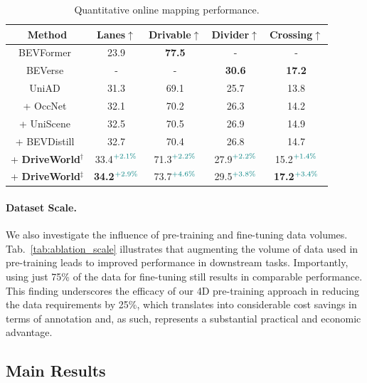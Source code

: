 \begin{table}[t]
	\centering
	\resizebox{0.5\textwidth}{!}
	{
		\begin{tabular}{c|c|c|c|c}
			\toprule
			\textbf{Method}&\textbf{Lanes}$\uparrow$&\textbf{Drivable}$\uparrow$&\textbf{Divider}$\uparrow$&\textbf{Crossing}$\uparrow$\\
			\midrule
			BEVFormer~\cite{bevformer}&23.9&\bf77.5&-&- \\
			BEVerse~\cite{beverse} &-&-&\bf30.6&\bf17.2 \\
			\midrule
			UniAD~\cite{uniad}&31.3&69.1&25.7&13.8 \\
			+ OccNet~\cite{occnet}&32.1&70.2&26.3&14.2 \\ 
			+ UniScene~\cite{uniscene}&32.5&70.5&26.9&14.9 \\ 
			+ BEVDistill~\cite{bevdistill}&32.7&70.4&26.8&14.7 \\ 
			\midrule
			\rowcolor{gray!10}+ \textbf{DriveWorld}$^{\dagger }$  &33.4$^{\textcolor{teal} {+2.1\%}}$&71.3$^{\textcolor{teal} {+2.2\%}}$&27.9$^{\textcolor{teal} {+2.2\%}}$&15.2$^{\textcolor{teal} {+1.4\%}}$\\
			\rowcolor{gray!10}+ \textbf{DriveWorld}$^{\ddagger }$ &\bf34.2$^{\textcolor{teal} {+2.9\%}}$&73.7$^{\textcolor{teal} {+4.6\%}}$&29.5$^{\textcolor{teal} {+3.8\%}}$&\bf17.2$^{\textcolor{teal} {+3.4\%}}$\\
			\bottomrule
		\end{tabular}
	}
	\caption{Quantitative online mapping performance.}
	\label{tab:mapping}
\end{table}
\paragraph{Dataset Scale.}

We also investigate the influence of pre-training and fine-tuning data volumes. Tab.~\ref{tab:ablation_scale} illustrates that augmenting the volume of data used in pre-training leads to improved performance in downstream tasks. Importantly, using just 75\% of the data for fine-tuning still results in comparable performance. This finding underscores the efficacy of our 4D pre-training approach in reducing the data requirements by 25\%, which translates into considerable cost savings in terms of annotation and, as such, represents a substantial practical and economic advantage.

\subsection{Main Results}

